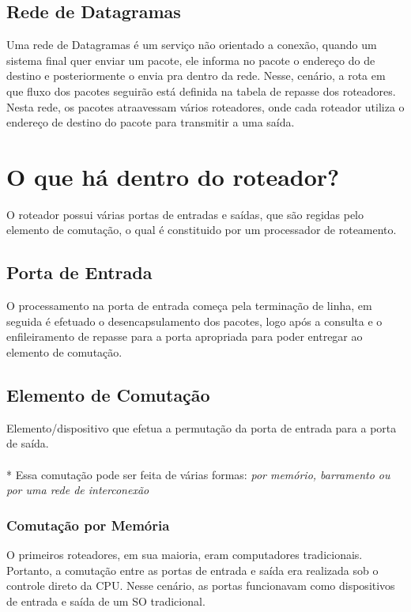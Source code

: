 \documentclass[a4paper, 12pt]{article}
\begin{document}
\subsection{Rede de Datagramas}
Uma rede de Datagramas é um serviço não orientado a conexão, quando um sistema final quer enviar um pacote, ele informa no pacote
o endereço do de destino e posteriormente o envia pra dentro da rede. Nesse, cenário, a rota em que fluxo dos pacotes seguirão está definida
na tabela de repasse dos roteadores. Nesta rede, os pacotes atraavessam vários roteadores, onde cada roteador utiliza o endereço de destino do 
pacote para transmitir a uma saída.

\newpage
\section{O que há dentro do roteador?}
O roteador possui várias portas de entradas e saídas, que são regidas pelo elemento de comutação, o qual é constituido por um processador de
roteamento.

    \subsection{Porta de Entrada}
    O processamento na porta de entrada começa pela terminação de linha, em seguida é efetuado o desencapsulamento dos pacotes, logo após a consulta e o
    enfileiramento de repasse para a porta apropriada para poder entregar ao elemento de comutação.

        \subsection{Elemento de Comutação}
        Elemento/dispositivo que efetua a permutação da porta de entrada para a porta de saída.
        \\
        \\*
        Essa comutação pode ser feita de várias formas: \textit{por memório, barramento ou por uma rede de interconexão}

        \subsubsection{Comutação por Memória}
        O primeiros roteadores, em sua maioria, eram computadores tradicionais. Portanto, a comutação entre as portas de entrada e saída era realizada 
        sob o controle direto da CPU. Nesse cenário, as portas funcionavam como dispositivos de entrada e saída de um SO tradicional.
\end{document}
